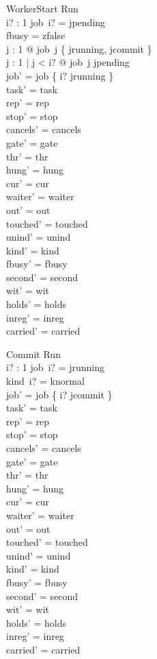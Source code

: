 \documentclass[a4paper,10pt,fleqn]{article}
\begin{document}
\begin{schema}{WorkerStart}
\Delta Run \\ i? : 1 
\where
job~i? = jpending \\
fbusy = zfalse \\
\forall j : 1  @ job~j \notin \{ jrunning, jcommit \} \\
\forall j : 1  | j < i? @ job~j \neq jpending \\
job' = job \oplus \{ i? \mapsto jrunning \} \\
task' = task \\
rep' = rep \\
stop' = stop \\
cancels' = cancels \\
gate' = gate \\
thr' = thr \\
hung' = hung \\
cur' = cur \\
waiter' = waiter \\
out' = out \\
touched' = touched \\
unind' = unind \\
kind' = kind \\
fbusy' = fbusy \\
second' = second \\
wit' = wit \\
holds' = holds \\
inreg' = inreg \\
carried' = carried
\end{schema}

\begin{schema}{Commit}
\Delta Run \\ i? : 1 
\where
job~i? = jrunning \\
kind~i? = knormal \\
job' = job \oplus \{ i? \mapsto jcommit \} \\
task' = task \\
rep' = rep \\
stop' = stop \\
cancels' = cancels \\
gate' = gate \\
thr' = thr \\
hung' = hung \\
cur' = cur \\
waiter' = waiter \\
out' = out \\
touched' = touched \\
unind' = unind \\
kind' = kind \\
fbusy' = fbusy \\
second' = second \\
wit' = wit \\
holds' = holds \\
inreg' = inreg \\
carried' = carried
\end{schema}
\end{document}
